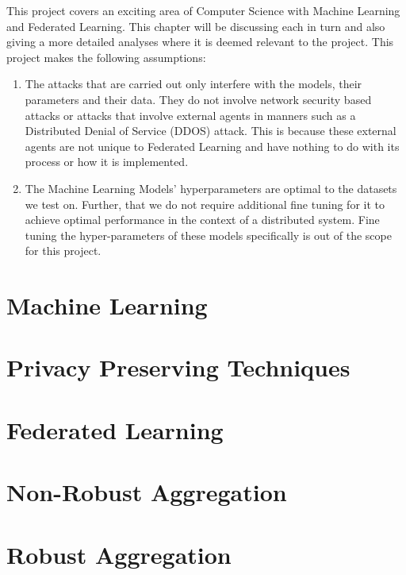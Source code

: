 This project covers an exciting area of Computer Science with Machine Learning and Federated Learning.
This chapter will be discussing each in turn and also giving a more detailed analyses where it is deemed relevant to the project.
This project makes the following assumptions:

\begin{enumerate}
    \item The attacks that are carried out only interfere with the models, their parameters and their data. They do not involve network security based attacks or attacks that involve external agents in manners such as a Distributed Denial of Service (DDOS) attack.
    This is because these external agents are not unique to Federated Learning and have nothing to do with its process or how it is implemented.
    
    \item The Machine Learning Models' hyperparameters are optimal to the datasets we test on. Further, that we do not require additional fine tuning for it to achieve optimal performance in the context of a distributed system. Fine tuning the hyper-parameters of these models specifically is out of the scope for this project.
\end{enumerate}


\section{Machine Learning}




\section{Privacy Preserving Techniques}




\section{Federated Learning}




\section{Non-Robust Aggregation}




\section{Robust Aggregation}



